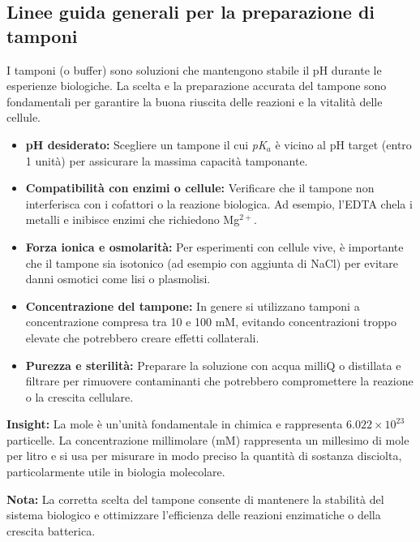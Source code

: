 \subsection{Linee guida generali per la preparazione di tamponi}

I tamponi (o buffer) sono soluzioni che mantengono stabile il pH durante le esperienze biologiche. La scelta e la preparazione accurata del tampone sono fondamentali per garantire la buona riuscita delle reazioni e la vitalità delle cellule.

\begin{itemize}\footnotesize
    \item \textbf{pH desiderato:} Scegliere un tampone il cui \textit{pK}$_a$ è vicino al pH target (entro 1 unità) per assicurare la massima capacità tamponante.
    \item \textbf{Compatibilità con enzimi o cellule:} Verificare che il tampone non interferisca con i cofattori o la reazione biologica. Ad esempio, l’EDTA chela i metalli e inibisce enzimi che richiedono Mg$^{2+}$.
    \item \textbf{Forza ionica e osmolarità:} Per esperimenti con cellule vive, è importante che il tampone sia isotonico (ad esempio con aggiunta di NaCl) per evitare danni osmotici come lisi o plasmolisi.
    \item \textbf{Concentrazione del tampone:} In genere si utilizzano tamponi a concentrazione compresa tra 10 e 100 mM, evitando concentrazioni troppo elevate che potrebbero creare effetti collaterali.
    \item \textbf{Purezza e sterilità:} Preparare la soluzione con acqua milliQ o distillata e filtrare per rimuovere contaminanti che potrebbero compromettere la reazione o la crescita cellulare.
\end{itemize}

\begin{insightBox}
  \textbf{Insight:} La mole è un’unità fondamentale in chimica e rappresenta $6.022 \times 10^{23}$ particelle. La concentrazione millimolare (mM) rappresenta un millesimo di mole per litro e si usa per misurare in modo preciso la quantità di sostanza disciolta, particolarmente utile in biologia molecolare.
\end{insightBox}

\begin{notaBox}
    \textbf{Nota:} La corretta scelta del tampone consente di mantenere la stabilità del sistema biologico e ottimizzare l’efficienza delle reazioni enzimatiche o della crescita batterica.
\end{notaBox}
